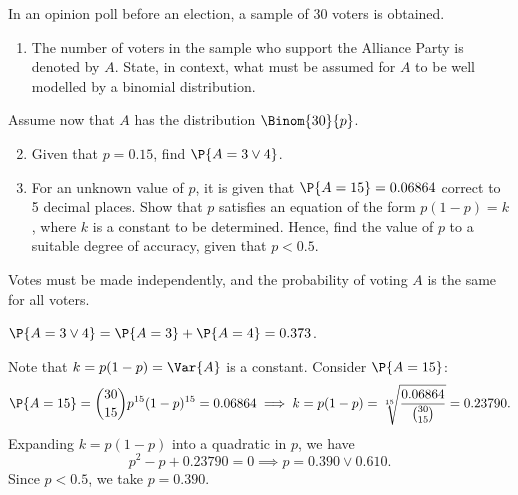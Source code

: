 \begin{problem}
    In an opinion poll before an election, a sample of 30 voters is obtained.
    \begin{enumerate}
        \item The number of voters in the sample who support the Alliance Party is denoted by $A$. State, in context, what must be assumed for $A$ to be well modelled by a binomial distribution.
    \end{enumerate}
    Assume now that $A$ has the distribution $\Binom{30}{p}$.
    \begin{enumerate}
        \setcounter{enumi}{1}
        \item Given that $p = 0.15$, find $\P{A = 3 \lor 4}$.
        \item For an unknown value of $p$, it is given that $\P{A = 15} = 0.06864$ correct to 5 decimal places. Show that $p$ satisfies an equation of the form $p(1-p)=k$, where $k$ is a constant to be determined. Hence, find the value of $p$ to a suitable degree of accuracy, given that $p<0.5$.
    \end{enumerate}
\end{problem}
\begin{solution}
    \begin{ppart}
        Votes must be made independently, and the probability of voting $A$ is the same for all voters.
    \end{ppart}
    \begin{ppart}
        $\P{A = 3 \lor 4} = \P{A = 3} + \P{A = 4} = 0.373$.
    \end{ppart}
    \begin{ppart}
        Note that $k = p(1- p) = \Var{A}$ is a constant. Consider $\P{A = 15}$: \[\P{A = 15} = \binom{30}{15} p^{15} (1-p)^{15} = 0.06864 \implies k = p(1-p) = \sqrt[15]{\frac{0.06864}{\binom{30}{15}}} = 0.23790.\] Expanding $k = p(1-p)$ into a quadratic in $p$, we have \[p^2 - p + 0.23790 = 0 \implies p = 0.390 \lor 0.610.\] Since $p < 0.5$, we take $p = 0.390$.
    \end{ppart}
\end{solution}

